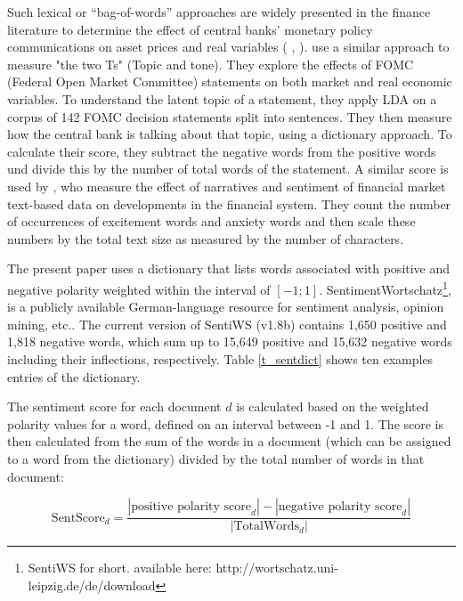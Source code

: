 \documentclass[12pt,a4paper,notitlepage]{article}
\begin{document}
Such lexical or “bag-of-words” approaches are widely presented in the finance literature to determine the effect of central banks' monetary policy communications on asset prices and real variables (\citet{nyman_news_2018} \citet{tetlock_giving_2007}, \citet{tetlock_more_2008}). \citet{hansen_shocking_2016} use a similar approach to measure "the two Ts" (Topic and tone). They explore the effects of FOMC (Federal Open Market Committee) statements on both market and real economic variables. To understand the latent topic of a statement, they apply LDA on a corpus of 142 FOMC decision statements split into sentences. They then measure how the central bank is talking about that topic, using a dictionary approach. To calculate their score, they subtract the negative words from the positive words und divide this by the number of total words of the statement. A similar score is used by \citet{nyman_news_2018}, who measure the effect of narratives and sentiment of financial market text-based data on developments in the financial system. They count the number of occurrences of excitement words and anxiety words and then scale these numbers by the total text size as measured by the number of characters.

The present paper uses a dictionary that lists words associated with positive and negative polarity weighted within the interval of $[-1; 1]$. SentimentWortschatz\footnote{SentiWS for short. available here: http://wortschatz.uni-leipzig.de/de/download}, is a publicly available German-language resource for sentiment analysis, opinion mining, etc.. The current version of SentiWS (v1.8b) contains 1,650 positive and 1,818 negative words, which sum up to 15,649 positive and 15,632 negative words including their inflections, respectively. Table \ref{t_sentdict} shows ten examples entries of the dictionary.



The sentiment score for each document $d$ is calculated  based on the weighted polarity values for a word, defined on an interval between -1 and 1. The score is then calculated from the sum of the words in a document (which can be assigned to a word from the dictionary) divided by the total number of words in that document:
 
\begin{equation}
	\text{SentScore}_d = \frac{|\text{positive polarity score}_d| - |\text{negative polarity score}_d|}{|\text{TotalWords}_d|}
\end{equation}
\end{document}
